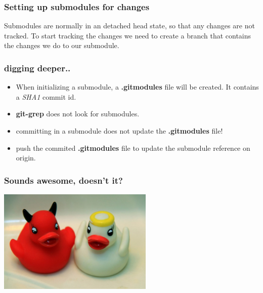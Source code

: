 \begin{frame}[fragile]
  \frametitle{Setting up submodules for changes}
   Submodules are normally in an detached head state, so that any changes are not tracked. To start tracking the changes we need to create a branch that contains the changes we do to our submodule.

\end{frame}

\begin{frame}
	\frametitle{digging deeper..}
	\begin{itemize}
		\item When initializing a submodule, a \textbf{.gitmodules} file will be created. It contains a \emph{SHA1} commit id.
		\item \textbf{git-grep} does not look for submodules.
		\item committing in a submodule does not update the \textbf{.gitmodules} file!
		\item push the commited \textbf{.gitmodules} file to update the submodule reference on origin.
	\end{itemize}
\end{frame}

\begin{frame}
	\frametitle{Sounds awesome, doesn't it?}
\begin{center}\includegraphics[width=280px]{images/goodbad.jpg}\end{center}
\end{frame}